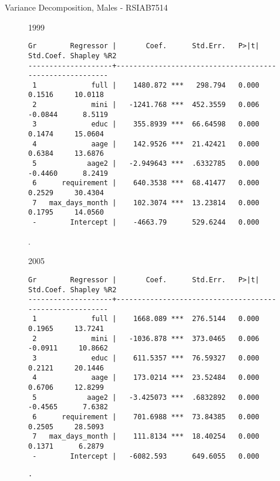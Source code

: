 \documentclass{beamer}
\begin{document}
\begin{frame}[fragile]{Variance Decomposition, Males - RSIAB7514}
\begin{figure}
\centering
\begin{minipage}[b]{0.4\textwidth}{1999}
\begin{Verbatim}[fontsize=\tiny]
Gr        Regressor |       Coef.      Std.Err.   P>|t|  Std.Coef. Shapley %R2
--------------------+---------------------------------------------------------
 1             full |    1480.872 ***   298.794   0.000     0.1516     10.0118
 2             mini |   -1241.768 ***  452.3559   0.006    -0.0844      8.5119
 3             educ |    355.8939 ***  66.64598   0.000     0.1474     15.0604
 4             aage |    142.9526 ***  21.42421   0.000     0.6384     13.6876
 5            aage2 |   -2.949643 ***  .6332785   0.000    -0.4460      8.2419
 6      requirement |    640.3538 ***  68.41477   0.000     0.2529     30.4304
 7   max_days_month |    102.3074 ***  13.23814   0.000     0.1795     14.0560
 -        Intercept |    -4663.79      529.6244   0.000 
\end{Verbatim}
\end{minipage}
\begin{minipage}{0.4\textwidth}
.
\end{minipage}
\end{figure}
\begin{figure}
\centering
\begin{minipage}[b]{0.4\textwidth}{2005}
\begin{Verbatim}[fontsize=\tiny]
Gr        Regressor |       Coef.      Std.Err.   P>|t|  Std.Coef. Shapley %R2
--------------------+---------------------------------------------------------
 1             full |    1668.089 ***  276.5144   0.000     0.1965     13.7241
 2             mini |   -1036.878 ***  373.0465   0.006    -0.0911     10.8662
 3             educ |    611.5357 ***  76.59327   0.000     0.2121     20.1446
 4             aage |    173.0214 ***  23.52484   0.000     0.6706     12.8299
 5            aage2 |   -3.425073 ***  .6832892   0.000    -0.4565      7.6382
 6      requirement |    701.6988 ***  73.84385   0.000     0.2505     28.5093
 7   max_days_month |    111.8134 ***  18.40254   0.000     0.1371      6.2879
 -        Intercept |   -6082.593      649.6055   0.000 
\end{Verbatim}
\end{minipage}
\begin{minipage}[b]{0.4\textwidth}
\begin{Verbatim}[fontsize=\tiny]
.
\end{Verbatim}
\end{minipage}
\end{figure}
\end{frame}
\end{document}
